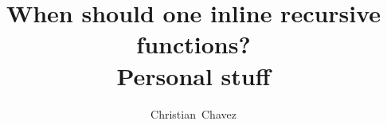 \documentclass[journal, a4paper, twoside, romanappendices]{IEEEtran}
\begin{document}
\title{When should one inline recursive functions? \\
Personal stuff}
\author{Christian~Chavez}
\maketitle



\clearpage

\end{document}
